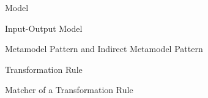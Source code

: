 

\begin{definition}{Model}
\label{def:model_appendix}


\end{definition}



\begin{definition}{Input-Output Model\\}
\label{def:input_output_model_appendix} 


\end{definition}



\begin{definition}{Metamodel Pattern and Indirect Metamodel Pattern}
\label{def:metamodel_pattern_appendix} 

\end{definition}


\begin{definition}{Transformation Rule}
\label{def:transformation_rule_appendix}

\end{definition}



\begin{definition}{Matcher of a Transformation Rule}
\label{def:back_match_transformation_rule_appendix}

\end{definition}

